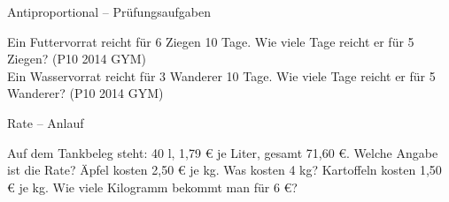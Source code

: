 \begin{aufgabe}{Antiproportional – Prüfungsaufgaben}
\begin{teile}
\teil Ein Futtervorrat reicht für 6 Ziegen 10 Tage. Wie viele Tage reicht er für 5 Ziegen? \hfill (P10 2014 GYM) \\ \leerfeld[Tage]
\teil Ein Wasservorrat reicht für 3 Wanderer 10 Tage. Wie viele Tage reicht er für 5 Wanderer? \hfill (P10 2014 GYM) \\ \leerfeld[Tage]
\end{teile}
\end{aufgabe}

\begin{aufgabe}{Rate – Anlauf}
\begin{teile}
\teil Auf dem Tankbeleg steht: 40 l, 1,79 € je Liter, gesamt 71,60 €. Welche Angabe ist die Rate?
\teil Äpfel kosten 2,50 € je kg. Was kosten 4 kg? \leerfeld[€]
\teil Kartoffeln kosten 1,50 € je kg. Wie viele Kilogramm bekommt man für 6 €? \leerfeld[kg]
\end{teile}
\end{aufgabe}

